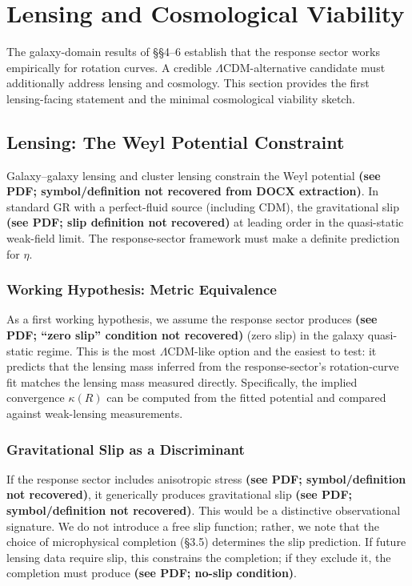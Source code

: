 \section{Lensing and Cosmological Viability}

The galaxy-domain results of \S\S4--6 establish that the response sector works empirically for rotation curves. A credible $\Lambda$CDM-alternative candidate must additionally address lensing and cosmology. This section provides the first lensing-facing statement and the minimal cosmological viability sketch.

\subsection{Lensing: The Weyl Potential Constraint}

\begin{sloppypar}
Galaxy--galaxy lensing and cluster lensing constrain the Weyl potential \textbf{(see PDF; symbol/definition not recovered from DOCX extraction)}. In standard GR with a perfect-fluid source (including CDM), the gravitational slip
\textbf{(see PDF; slip definition not recovered)}
at leading order in the quasi-static weak-field limit. The response-sector framework must make a definite prediction for $\eta$.
\end{sloppypar}

\subsubsection{Working Hypothesis: Metric Equivalence}

As a first working hypothesis, we assume the response sector produces \textbf{(see PDF; ``zero slip'' condition not recovered)} (zero slip) in the galaxy quasi-static regime. This is the most $\Lambda$CDM-like option and the easiest to test: it predicts that the lensing mass inferred from the response-sector's rotation-curve fit matches the lensing mass measured directly. Specifically, the implied convergence $\kappa(R)$ can be computed from the fitted potential and compared against weak-lensing measurements.

\subsubsection{Gravitational Slip as a Discriminant}

If the response sector includes anisotropic stress \textbf{(see PDF; symbol/definition not recovered)}, it generically produces gravitational slip \textbf{(see PDF; symbol/definition not recovered)}. This would be a distinctive observational signature. We do not introduce a free slip function; rather, we note that the choice of microphysical completion (\S3.5) determines the slip prediction. If future lensing data require slip, this constrains the completion; if they exclude it, the completion must produce \textbf{(see PDF; no-slip condition)}.

